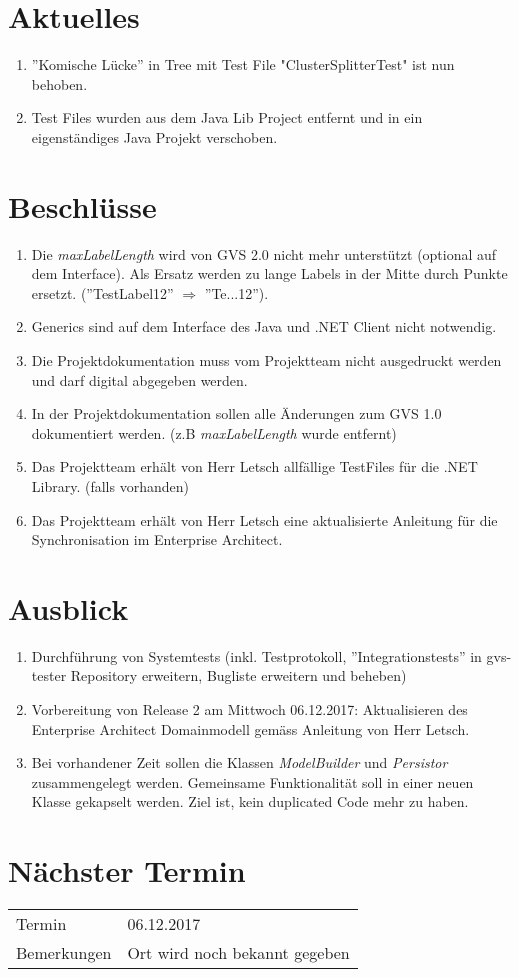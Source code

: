 \documentclass[11pt, a4paper,oneside]{scrartcl}
\begin{document}
	\section{Aktuelles}
		\begin{enumerate}
		\item ''Komische Lücke'' in Tree mit Test File "ClusterSplitterTest" ist nun behoben.
		\item Test Files wurden aus dem Java Lib Project entfernt und in ein eigenständiges Java Projekt verschoben.
	\end{enumerate} 
	
	\section{Beschlüsse}
	\begin{enumerate}
		\item Die \textit{maxLabelLength} wird von GVS 2.0 nicht mehr unterstützt (optional auf dem Interface). Als Ersatz werden zu lange Labels in der Mitte durch Punkte ersetzt. (''TestLabel12'' $\Rightarrow$ ''Te...12'').
		\item Generics sind auf dem Interface des Java und .NET Client nicht notwendig.
		\item Die Projektdokumentation muss vom Projektteam nicht ausgedruckt werden und darf digital abgegeben werden.	
		\item In der Projektdokumentation sollen alle Änderungen zum GVS 1.0 dokumentiert werden. (z.B \textit{maxLabelLength} wurde entfernt)
		\item Das Projektteam erhält von Herr Letsch allfällige TestFiles für die .NET Library. (falls vorhanden)
		\item Das Projektteam erhält von Herr Letsch eine aktualisierte Anleitung für die Synchronisation im Enterprise Architect.
	\end{enumerate} 
	
	\section{Ausblick}
	\begin{enumerate}
		\item Durchführung von Systemtests (inkl. Testprotokoll, ''Integrationstests'' in gvs-tester Repository erweitern, Bugliste erweitern und beheben)
		\item Vorbereitung von Release 2 am Mittwoch 06.12.2017: Aktualisieren des Enterprise Architect Domainmodell gemäss Anleitung von Herr Letsch.
		\item Bei vorhandener Zeit sollen die Klassen \textit{ModelBuilder} und \textit{Persistor} zusammengelegt werden. Gemeinsame Funktionalität soll in einer neuen Klasse gekapselt werden. Ziel ist, kein duplicated Code mehr zu haben.
	\end{enumerate}
	
	\section{Nächster Termin}
	\begin{tabu} to \linewidth {l X }
		\toprule
		Termin & 06.12.2017  \\
		Bemerkungen & Ort wird noch bekannt gegeben  \\
		\bottomrule
	\end{tabu}
	
\end{document}

